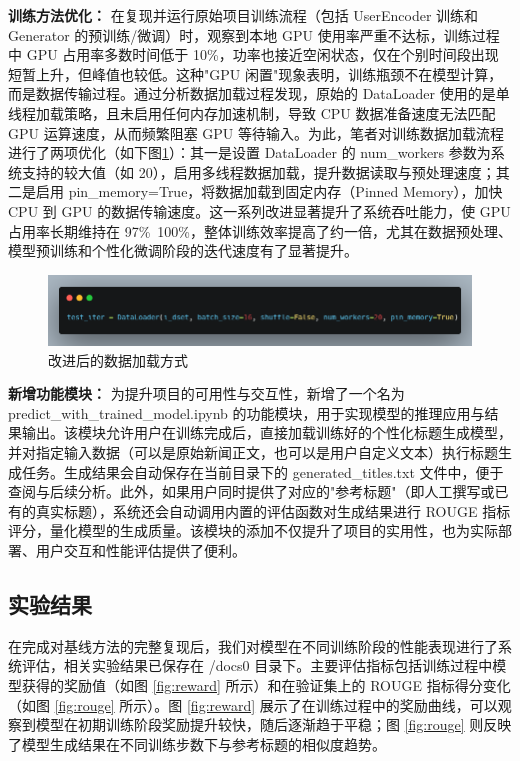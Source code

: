 \documentclass[10pt,a4paper]{article}
\begin{document}
\textbf{训练方法优化：}
在复现并运行原始项目训练流程（包括 UserEncoder 训练和 Generator 的预训练/微调）时，观察到本地 GPU 使用率严重不达标，训练过程中 GPU 占用率多数时间低于 10\%，功率也接近空闲状态，仅在个别时间段出现短暂上升，但峰值也较低。这种"GPU 闲置"现象表明，训练瓶颈不在模型计算，而是数据传输过程。通过分析数据加载过程发现，原始的 DataLoader 使用的是单线程加载策略，且未启用任何内存加速机制，导致 CPU 数据准备速度无法匹配 GPU 运算速度，从而频繁阻塞 GPU 等待输入。为此，笔者对训练数据加载流程进行了两项优化（如下图\ref{fig:data_loader}）：其一是设置 DataLoader 的 num\_workers 参数为系统支持的较大值（如 20），启用多线程数据加载，提升数据读取与预处理速度；其二是启用 pin\_memory=True，将数据加载到固定内存（Pinned Memory），加快 CPU 到 GPU 的数据传输速度。这一系列改进显著提升了系统吞吐能力，使 GPU 占用率长期维持在 97\%~100\%，整体训练效率提高了约一倍，尤其在数据预处理、模型预训练和个性化微调阶段的迭代速度有了显著提升。

\begin{figure}[H]
  \centering
  \includegraphics[width=15cm]{fig/dataloader.png}
  \caption{改进后的数据加载方式}\label{fig:data_loader}
\end{figure}


\textbf{新增功能模块：}
为提升项目的可用性与交互性，新增了一个名为 predict\_with\_trained\_model.ipynb 的功能模块，用于实现模型的推理应用与结果输出。该模块允许用户在训练完成后，直接加载训练好的个性化标题生成模型，并对指定输入数据（可以是原始新闻正文，也可以是用户自定义文本）执行标题生成任务。生成结果会自动保存在当前目录下的 generated\_titles.txt 文件中，便于查阅与后续分析。此外，如果用户同时提供了对应的"参考标题"（即人工撰写或已有的真实标题），系统还会自动调用内置的评估函数对生成结果进行 ROUGE 指标评分，量化模型的生成质量。该模块的添加不仅提升了项目的实用性，也为实际部署、用户交互和性能评估提供了便利。

\subsection{实验结果}
在完成对基线方法的完整复现后，我们对模型在不同训练阶段的性能表现进行了系统评估，相关实验结果已保存在 /docs0 目录下。主要评估指标包括训练过程中模型获得的奖励值（如图 \ref{fig:reward} 所示）和在验证集上的 ROUGE 指标得分变化（如图 \ref{fig:rouge} 所示）。图 \ref{fig:reward} 展示了在训练过程中的奖励曲线，可以观察到模型在初期训练阶段奖励提升较快，随后逐渐趋于平稳；图 \ref{fig:rouge} 则反映了模型生成结果在不同训练步数下与参考标题的相似度趋势。
\end{document}
